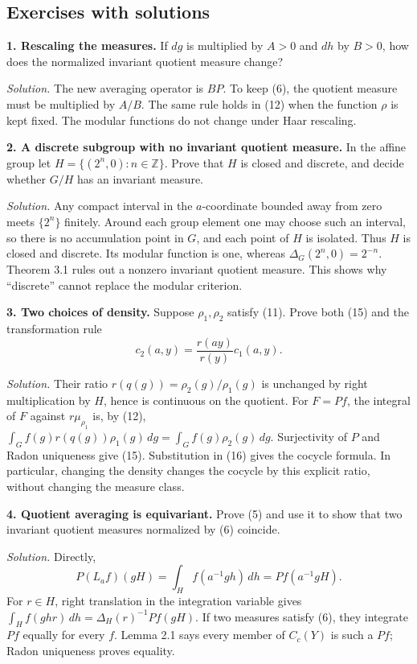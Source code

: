 \documentclass[
  english,
  11pt,
  a4paper,
]{article}
\begin{document}
\subsection{Exercises with
solutions}\label{quotient-measures-and-weils-integration-formula--exercises-with-solutions}

\textbf{1. Rescaling the measures.} If \(dg\) is multiplied by \(A>0\)
and \(dh\) by \(B>0\), how does the normalized invariant quotient
measure change?

\emph{Solution.} The new averaging operator is \(BP\). To keep (6), the
quotient measure must be multiplied by \(A/B\). The same rule holds in
(12) when the function \(\rho\) is kept fixed. The modular functions do
not change under Haar rescaling.

\textbf{2. A discrete subgroup with no invariant quotient measure.} In
the affine group let \(H=\{(2^n,0):n\in\mathbb Z\}\). Prove that \(H\)
is closed and discrete, and decide whether \(G/H\) has an invariant
measure.

\emph{Solution.} Any compact interval in the \(a\)-coordinate bounded
away from zero meets \(\{2^n\}\) finitely. Around each group element one
may choose such an interval, so there is no accumulation point in \(G\),
and each point of \(H\) is isolated. Thus \(H\) is closed and discrete.
Its modular function is one, whereas \(\Delta_G(2^n,0)=2^{-n}\). Theorem
3.1 rules out a nonzero invariant quotient measure. This shows why
``discrete'' cannot replace the modular criterion.

\textbf{3. Two choices of density.} Suppose \(\rho_1,\rho_2\) satisfy
(11). Prove both (15) and the transformation rule
\[c_2(a,y)=\frac{r(ay)}{r(y)}c_1(a,y).\]

\emph{Solution.} Their ratio \(r(q(g))=\rho_2(g)/\rho_1(g)\) is
unchanged by right multiplication by \(H\), hence is continuous on the
quotient. For \(F=Pf\), the integral of \(F\) against \(r\mu_{\rho_1}\)
is, by (12),
\(\int_G f(g)r(q(g))\rho_1(g)\,dg=\int_G f(g)\rho_2(g)\,dg\).
Surjectivity of \(P\) and Radon uniqueness give (15). Substitution in
(16) gives the cocycle formula. In particular, changing the density
changes the cocycle by this explicit ratio, without changing the measure
class.

\textbf{4. Quotient averaging is equivariant.} Prove (5) and use it to
show that two invariant quotient measures normalized by (6) coincide.

\emph{Solution.} Directly,
\[P(L_a f)(gH)=\int_Hf(a^{-1}gh)\,dh=Pf(a^{-1}gH).\] For \(r\in H\),
right translation in the integration variable gives
\(\int_H f(ghr)\,dh=\Delta_H(r)^{-1}Pf(gH)\). If two measures satisfy
(6), they integrate \(Pf\) equally for every \(f\). Lemma 2.1 says every
member of \(C_c(Y)\) is such a \(Pf\); Radon uniqueness proves equality.
\end{document}
